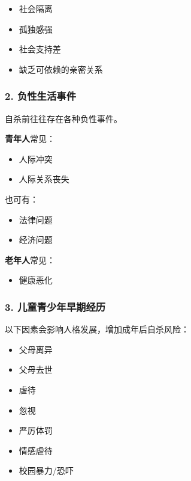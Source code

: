 \documentclass[
  chinese,
  9pt,
  a4paper,
]{ctexart}
\providecommand{\tightlist}{%
  \setlength{\itemsep}{0pt}\setlength{\parskip}{0pt}}
\begin{document}
\begin{itemize}
\tightlist
\item
  社会隔离
\item
  孤独感强
\item
  社会支持差
\item
  缺乏可依赖的亲密关系
\end{itemize}

\subsubsection{2.
负性生活事件}\label{ux8d1fux6027ux751fux6d3bux4e8bux4ef6}

自杀前往往存在各种负性事件。

\textbf{青年人}常见：

\begin{itemize}
\tightlist
\item
  人际冲突
\item
  人际关系丧失
\end{itemize}

也可有：

\begin{itemize}
\tightlist
\item
  法律问题
\item
  经济问题
\end{itemize}

\textbf{老年人}常见：

\begin{itemize}
\tightlist
\item
  健康恶化
\end{itemize}

\subsubsection{3.
儿童青少年早期经历}\label{ux513fux7ae5ux9752ux5c11ux5e74ux65e9ux671fux7ecfux5386}

以下因素会影响人格发展，增加成年后自杀风险：

\begin{itemize}
\tightlist
\item
  父母离异
\item
  父母去世
\item
  虐待
\item
  忽视
\item
  严厉体罚
\item
  情感虐待
\item
  校园暴力/恐吓
\end{itemize}
\end{document}
